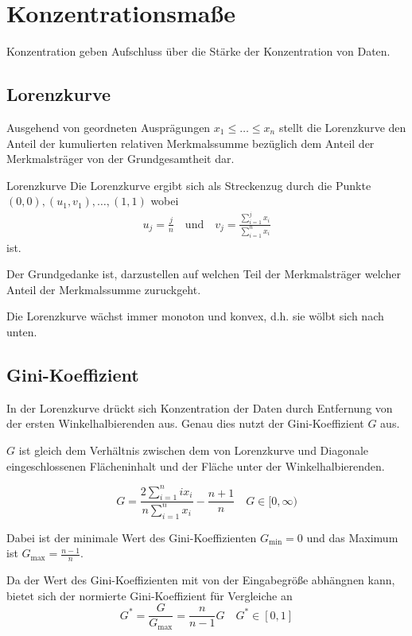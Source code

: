 \section{Konzentrationsmaße}
Konzentration geben Aufschluss über die Stärke der Konzentration von Daten.
\subsection{Lorenzkurve}
Ausgehend von geordneten Ausprägungen $x_1\leq\ldots\leq x_n$ stellt die Lorenzkurve den Anteil der kumulierten relativen Merkmalssumme bezüglich dem Anteil der Merkmalsträger von der Grundgesamtheit dar.

\begin{definition}{Lorenzkurve}
	Die Lorenzkurve ergibt sich als Streckenzug durch die Punkte $(0,0), (u_1,v_1),\ldots,(1,1)$ wobei
	\begin{align*}
	    u_j=\frac jn \quad \text{und}\quad 
	    v_j=\frac{\sum_{i=1}^j x_i}{\sum_{i=1}^n x_i}
	\end{align*}
ist.
\end{definition}

Der Grundgedanke ist, darzustellen auf welchen Teil der Merkmalsträger welcher Anteil der Merkmalssumme zuruckgeht.

Die Lorenzkurve wächst immer monoton und konvex, d.h. sie wölbt sich nach unten.

\subsection{Gini-Koeffizient}
In der Lorenzkurve drückt sich Konzentration der Daten durch Entfernung von der ersten Winkelhalbierenden aus. Genau dies nutzt der Gini-Koeffizient $G$ aus.

$G$ ist gleich dem Verhältnis zwischen dem von Lorenzkurve und Diagonale eingeschlossenen Flächeninhalt und der Fläche unter der Winkelhalbierenden.

\begin{equation*}
	G=\frac{2\sum_{i=1}^n ix_i}{n\sum_{i=1}^n x_i}-\frac{n+1}{n}\quad G\in[0,\infty)
\end{equation*}

Dabei ist der minimale Wert des Gini-Koeffizienten $G_{\text{min}}=0$ und das Maximum ist $G_{\text{max}}=\frac{n-1}n$.

Da der Wert des Gini-Koeffizienten mit von der Eingabegröße abhängnen kann, bietet sich der normierte Gini-Koeffizient für Vergleiche an
\begin{equation*}
	G^\ast = \frac{G}{G_{\text{max}}}=\frac{n}{n-1}G\quad G^\ast\in[0,1]
\end{equation*}
